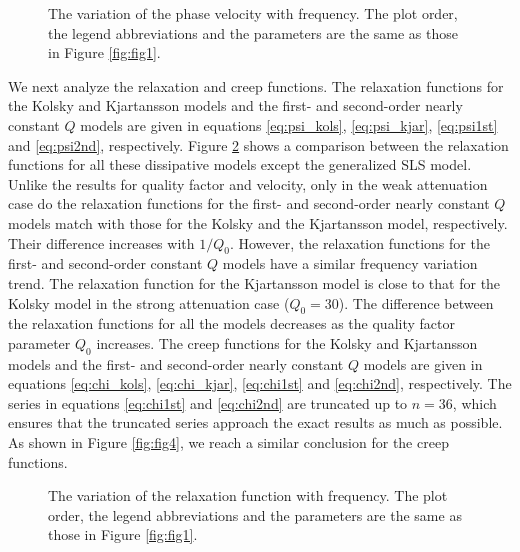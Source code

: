 \documentclass[article]{./macros/elsarticle_qh}
\begin{document}
\begin{figure}[H]
\centering
{}
\caption{
The variation of the phase velocity with frequency. The plot order, the legend abbreviations and the parameters are the same as those in Figure \ref{fig:fig1}.  
}
\label{fig:fig2}
\end{figure}

We next analyze the relaxation and creep functions. The relaxation functions for the Kolsky and Kjartansson models and the first- and second-order nearly constant $Q$ models are given in equations \ref{eq:psi_kols}, \ref{eq:psi_kjar}, \ref{eq:psi1st} and \ref{eq:psi2nd}, respectively. Figure \ref{fig:fig3} shows a comparison between the relaxation functions for all these dissipative models except the generalized SLS model. Unlike the results for quality factor and velocity, only in the weak attenuation case do the relaxation functions for the first- and second-order nearly constant $Q$ models match with those for the Kolsky and the Kjartansson model, respectively. Their difference increases with $1/Q_{0}$. However, the relaxation functions for the first- and second-order constant $Q$ models have a similar frequency variation trend. The relaxation function for the Kjartansson model is close to that for the Kolsky model in the strong attenuation case ($Q_{0} = 30$). The difference between the relaxation functions for all the models decreases as the quality factor parameter $Q_{0}$ increases. The creep functions for the Kolsky and Kjartansson models and the first- and second-order nearly constant $Q$ models are given in equations \ref{eq:chi_kols}, \ref{eq:chi_kjar}, \ref{eq:chi1st} and \ref{eq:chi2nd}, respectively. 
The series in equations \ref{eq:chi1st} and \ref{eq:chi2nd} are truncated up to $n=36$, which ensures that the truncated series approach the exact results as much as possible. As shown in Figure \ref{fig:fig4}, we reach a similar conclusion for the creep functions. 

\begin{figure}[H]
\centering
{}
\caption{
The variation of the relaxation function with frequency. The plot order, the legend abbreviations and the parameters are the same as those in Figure \ref{fig:fig1}. 
}
\label{fig:fig3}
\end{figure}
\end{document}
